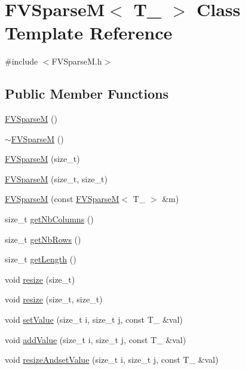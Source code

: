 \hypertarget{classFVSparseM}{
\section{FVSparseM$<$ T\_\- $>$ Class Template Reference}
\label{d2/d4d/classFVSparseM}
}


{\ttfamily \#include $<$FVSparseM.h$>$}

\subsection*{Public Member Functions}
\begin{DoxyCompactItemize}
\item 
\hyperlink{classFVSparseM_a04619c49ecf6808288fc10d0aaad70e1}{FVSparseM} ()
\item 
\hyperlink{classFVSparseM_a0df0d4878e3fb5bdae16f941b3154260}{$\sim$FVSparseM} ()
\item 
\hyperlink{classFVSparseM_a7c14fc91b113dd18acba072ba1288553}{FVSparseM} (size\_\-t)
\item 
\hyperlink{classFVSparseM_a0056e1e81f3b707ff99b988af48d0503}{FVSparseM} (size\_\-t, size\_\-t)
\item 
\hyperlink{classFVSparseM_a4c75a856ea17c80c2c2c1ed799711f9d}{FVSparseM} (const \hyperlink{classFVSparseM}{FVSparseM}$<$ T\_\- $>$ \&m)
\item 
size\_\-t \hyperlink{classFVSparseM_ae66137e8cb36be98d9d2bd139d4ac021}{getNbColumns} ()
\item 
size\_\-t \hyperlink{classFVSparseM_a33f9a9828a0dd36b3aac2b519e621247}{getNbRows} ()
\item 
size\_\-t \hyperlink{classFVSparseM_a600073d563962412f8873bb598d52be7}{getLength} ()
\item 
void \hyperlink{classFVSparseM_a572d8018b3c8e381d4a8c924bfae3bc6}{resize} (size\_\-t)
\item 
void \hyperlink{classFVSparseM_aa4d3517d2f731ae2943983293a5b1103}{resize} (size\_\-t, size\_\-t)
\item 
void \hyperlink{classFVSparseM_a5145b2a41ccf168751d1dd9972859e32}{setValue} (size\_\-t i, size\_\-t j, const T\_\- \&val)
\item 
void \hyperlink{classFVSparseM_a53fdc14c5ce8e45b80846954c3cc0fbb}{addValue} (size\_\-t i, size\_\-t j, const T\_\- \&val)
\item 
void \hyperlink{classFVSparseM_a8c644f60a185c582b8eaa259d7b65aea}{resizeAndsetValue} (size\_\-t i, size\_\-t j, const T\_\- \&val)
\item 

\end{DoxyCompactItemize}
